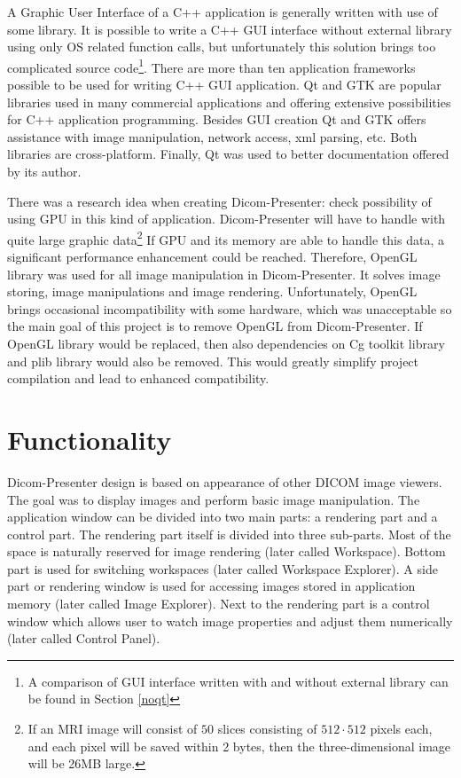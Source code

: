 A Graphic User Interface of a C++ application is generally written with use of some library. It is possible to write a C++ GUI interface without external library using only OS related function calls, but unfortunately this solution brings too complicated source code\footnote{A comparison of GUI interface written with and without external library can be found in Section \ref{noqt}}. There are more than ten application frameworks possible to be used for writing C++ GUI application. Qt and GTK are popular libraries used in many commercial applications and offering extensive possibilities for C++ application programming\cite[pages~413-416]{qtvsgtk}. Besides GUI creation Qt and GTK offers assistance with image manipulation, network access, xml parsing, etc. Both libraries are cross-platform. Finally, Qt was used to better documentation offered by its author.

There was a research idea when creating Dicom-Presenter: check possibility of using GPU in this kind of application. Dicom-Presenter will have to handle with quite large graphic data\footnote{If an MRI image will consist of $50$ slices consisting of $512 \cdot 512$ pixels each, and each pixel will be saved within 2 bytes, then the three-dimensional image will be 26MB large\cite[page~121]{mrioverall}.} If GPU and its memory are able to handle this data, a significant performance enhancement could be reached. Therefore, OpenGL library was used for all image manipulation in Dicom-Presenter. It solves image storing, image manipulations and image rendering. Unfortunately, OpenGL brings occasional incompatibility with some hardware, which was unacceptable so the main goal of this project is to remove OpenGL from Dicom-Presenter. If OpenGL library would be replaced, then also dependencies on Cg toolkit library and plib library would also be removed. This would greatly simplify project compilation and lead to enhanced compatibility.



\section{Functionality}
\label{dicom-presenter}
Dicom-Presenter design is based on appearance of other DICOM image viewers. The goal was to display images and perform basic image manipulation. The application window can be divided into two main parts: a rendering part and a control part. The rendering part itself is divided into three sub-parts. Most of the space is naturally reserved for image rendering (later called Workspace). Bottom part is used for switching workspaces (later called Workspace Explorer). A side part or rendering window is used for accessing images stored in application memory (later called Image Explorer). Next to the rendering part is a control window which allows user to watch image  properties and adjust them numerically (later called Control Panel). 

